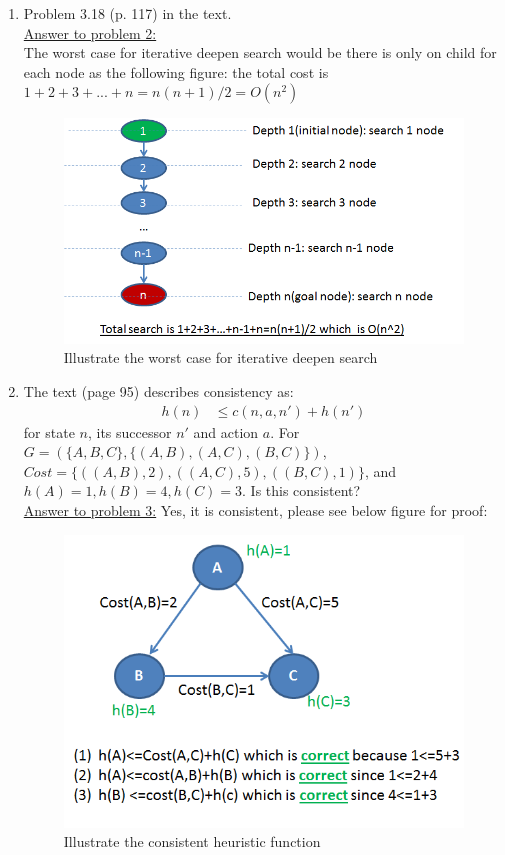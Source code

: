 \documentclass{article}
\begin{document}
\begin{enumerate}
\item Problem 3.18 (p. 117) in the text.\\
\underline{Answer to problem 2:}\\
The worst case for iterative deepen search would be there is only on child for each node as the following figure: the total cost is $1+2+3+...+n=n(n+1)/2=O(n^2)$
\begin{figure}[h]
\includegraphics[width=0.8\columnwidth]{hw2_q2}\centering 
\caption{Illustrate the worst case for iterative deepen search}
\end{figure}


\item The text (page 95) describes consistency as:
\begin{eqnarray*}
h(n) &\leq c(n,a,n') + h(n')
\end{eqnarray*}
for state $n$, its successor $n'$ and action $a$.  For $G = (\{A,B,C\},\{(A,B), (A,C), (B,C)\})$, $Cost = \{((A,B),2), ((A,C),5), ((B,C), 1)\}$, and $h(A) = 1, h(B) = 4, h(C) = 3$. Is this consistent?\\
\underline{Answer to problem 3:} Yes, it is consistent, please see below figure for proof:
\begin{figure}[h]
\includegraphics[width=0.8\columnwidth]{hw2_q3}\centering 
\caption{Illustrate the consistent heuristic function}
\end{figure}
  


\end{enumerate}
\end{document}
